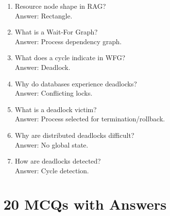 \begin{enumerate}
\item Resource node shape in RAG?\\
Answer: Rectangle.

\item What is a Wait-For Graph?\\
Answer: Process dependency graph.

\item What does a cycle indicate in WFG?\\
Answer: Deadlock.

\item Why do databases experience deadlocks?\\
Answer: Conflicting locks.

\item What is a deadlock victim?\\
Answer: Process selected for termination/rollback.

\item Why are distributed deadlocks difficult?\\
Answer: No global state.

\item How are deadlocks detected?\\
Answer: Cycle detection.
\end{enumerate}

\section{20 MCQs with Answers}

